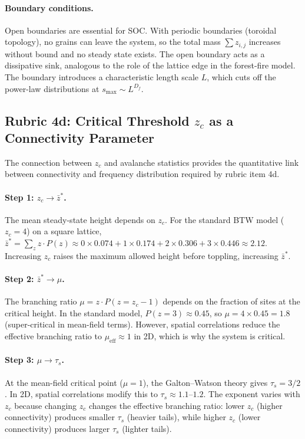 \documentclass[preprint,12pt]{elsarticle}
\begin{document}
\paragraph{Boundary conditions.}
Open boundaries are essential for SOC.
With periodic boundaries (toroidal topology), no grains can leave the
system, so the total mass $\sum z_{i,j}$ increases without bound and no
steady state exists.
The open boundary acts as a dissipative sink, analogous to the role of
the lattice edge in the forest-fire model.
The boundary introduces a characteristic length scale $L$, which cuts
off the power-law distributions at $s_\mathrm{max}\sim L^{D_f}$.


\subsection{Rubric 4d: Critical Threshold $z_c$ as a Connectivity Parameter}
\label{sec:connectivity}

The connection between $z_c$ and avalanche statistics provides the
quantitative link between connectivity and frequency distribution
required by rubric item 4d.

\paragraph{Step 1: $z_c \to \bar{z}^*$.}
The mean steady-state height depends on $z_c$.
For the standard BTW model ($z_c=4$) on a square lattice,
$\bar{z}^* = \sum_z z\cdot P(z) \approx 0\times0.074 + 1\times0.174
+ 2\times0.306 + 3\times0.446 \approx 2.12$.
Increasing $z_c$ raises the maximum allowed height before toppling,
increasing $\bar{z}^*$.

\paragraph{Step 2: $\bar{z}^* \to \mu$.}
The branching ratio $\mu = z \cdot P(z=z_c-1)$ depends on the fraction
of sites at the critical height.
In the standard model, $P(z=3)\approx0.45$, so
$\mu = 4\times0.45 = 1.8$ (super-critical in mean-field terms).
However, spatial correlations reduce the effective branching ratio to
$\mu_\mathrm{eff}\approx1$ in 2D, which is why the system is
critical.

\paragraph{Step 3: $\mu \to \tau_s$.}
At the mean-field critical point ($\mu=1$), the Galton--Watson theory
gives $\tau_s=3/2$.
In 2D, spatial correlations modify this to $\tau_s\approx1.1$--$1.2$.
The exponent varies with $z_c$ because changing $z_c$ changes the
effective branching ratio: lower $z_c$ (higher connectivity) produces
smaller $\tau_s$ (heavier tails), while higher $z_c$ (lower
connectivity) produces larger $\tau_s$ (lighter tails).
\end{document}
